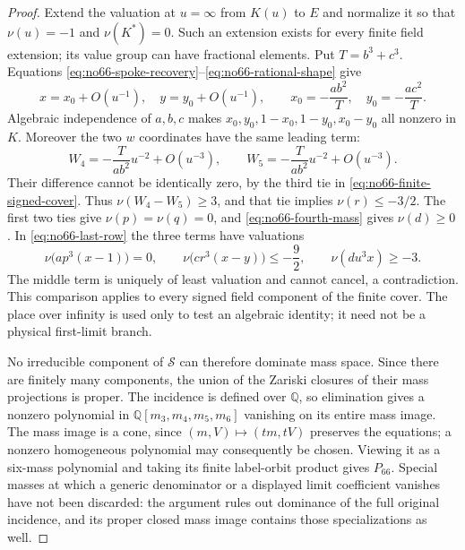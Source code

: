 \documentclass[11pt]{amsart}
\theoremstyle{remark}
\begin{document}
\begin{proof}
Extend the valuation at $u=\infty$ from $K(u)$ to $E$ and normalize
it so that $\nu(u)=-1$ and $\nu(K^*)=0$. Such an extension exists
for every finite field extension; its value group can have
fractional elements. Put $T=b^3+c^3$. Equations
\eqref{eq:no66-spoke-recovery}--\eqref{eq:no66-rational-shape} give
\[
 x=x_0+O(u^{-1}),\quad y=y_0+O(u^{-1}),\qquad
 x_0=-\frac{ab^2}{T},\quad y_0=-\frac{ac^2}{T}.
\]
Algebraic independence of $a,b,c$ makes
$x_0,y_0,1-x_0,1-y_0,x_0-y_0$ all nonzero in $K$.
Moreover the two $w$ coordinates have the same leading term:
\[
 W_4=-\frac{T}{ab^2}u^{-2}+O(u^{-3}),\qquad
 W_5=-\frac{T}{ab^2}u^{-2}+O(u^{-3}).
\]
Their difference cannot be identically zero, by the third tie in
\eqref{eq:no66-finite-signed-cover}. Thus
$\nu(W_4-W_5)\ge3$, and that tie implies
$\nu(r)\le-3/2$. The first two ties give
$\nu(p)=\nu(q)=0$, and \eqref{eq:no66-fourth-mass} gives
$\nu(d)\ge0$. In \eqref{eq:no66-last-row} the three terms have
valuations
\[
 \nu\bigl(ap^3(x-1)\bigr)=0,\qquad
 \nu\bigl(cr^3(x-y)\bigr)\le-\frac92,\qquad
 \nu(du^3x)\ge-3.
\]
The middle term is uniquely of least valuation and cannot cancel,
a contradiction. This comparison applies to every signed field
component of the finite cover. The place over infinity is used
only to test an algebraic identity; it need not be a physical
first-limit branch.

No irreducible component of $\mathcal S$ can therefore dominate
mass space. Since there are finitely many components, the union
of the Zariski closures of their mass projections is proper.
The incidence is defined over $\mathbb Q$, so elimination gives
a nonzero polynomial in $\mathbb Q[m_3,m_4,m_5,m_6]$ vanishing on
its entire mass image. The mass image is a cone, since
$(m,V)\mapsto(tm,tV)$ preserves the equations; a nonzero homogeneous
polynomial may consequently be chosen. Viewing it as a six-mass
polynomial and taking its finite label-orbit product gives $P_{66}$.
Special masses at which a generic denominator or a displayed
limit coefficient vanishes have not been discarded: the argument
rules out dominance of the full original incidence, and its
proper closed mass image contains those specializations as well.
\end{proof}
\end{document}
